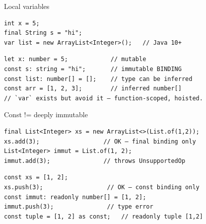 \documentclass[10pt]{article}
\begin{document}

\begin{construct}{Local variables}
\noindent
\begin{minipage}[t]{0.485\linewidth}
\begin{lstlisting}[style=java, title=Java]
int x = 5;
final String s = "hi";
var list = new ArrayList<Integer>();   // Java 10+
\end{lstlisting}
\end{minipage}\hfill
\begin{minipage}[t]{0.485\linewidth}
\begin{lstlisting}[style=ts, title=TypeScript]
let x: number = 5;            // mutable
const s: string = "hi";       // immutable BINDING
const list: number[] = [];    // type can be inferred
const arr = [1, 2, 3];        // inferred number[]
// `var` exists but avoid it — function-scoped, hoisted.
\end{lstlisting}
\end{minipage}
\end{construct}

\begin{construct}{Const != deeply immutable}
\noindent
\begin{minipage}[t]{0.485\linewidth}
\begin{lstlisting}[style=java, title=Java]
final List<Integer> xs = new ArrayList<>(List.of(1,2));
xs.add(3);                  // OK — final binding only
List<Integer> immut = List.of(1, 2);
immut.add(3);               // throws UnsupportedOp
\end{lstlisting}
\end{minipage}\hfill
\begin{minipage}[t]{0.485\linewidth}
\begin{lstlisting}[style=ts, title=TypeScript]
const xs = [1, 2];
xs.push(3);                  // OK — const binding only
const immut: readonly number[] = [1, 2];
immut.push(3);               // type error
const tuple = [1, 2] as const;   // readonly tuple [1,2]
\end{lstlisting}
\end{minipage}
\end{construct}

\end{document}

